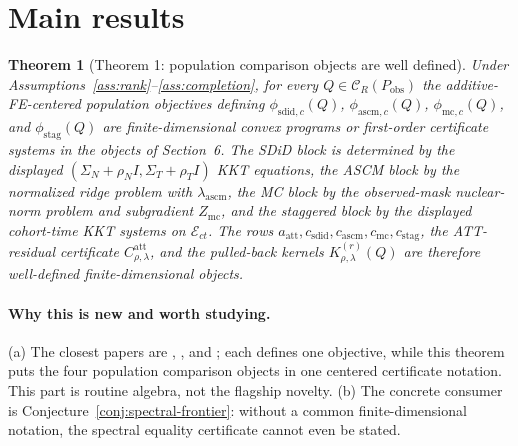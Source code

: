 \documentclass[11pt]{article}
\theoremstyle{definition}
\theoremstyle{plain}
\newtheorem{theorem}{Theorem}
\theoremstyle{remark}
\begin{document}
\section{Main results}
\begin{theorem}[Theorem 1: population comparison objects are well defined]\label{thm:functionals}
Under Assumptions~\ref{ass:rank}--\ref{ass:completion}, for every \(Q\in\mathcal C_R(P_{\mathrm{obs}})\) the additive-FE-centered population objectives defining \(\phi_{\mathrm{sdid},c}(Q)\), \(\phi_{\mathrm{ascm},c}(Q)\), \(\phi_{\mathrm{mc},c}(Q)\), and \(\phi_{\mathrm{stag}}(Q)\) are finite-dimensional convex programs or first-order certificate systems in the objects of Section~6.  The SDiD block is determined by the displayed \((\Sigma_N+\rho_N I,\Sigma_T+\rho_T I)\) KKT equations, the ASCM block by the normalized ridge problem with \(\lambda_{\mathrm{ascm}}\), the MC block by the observed-mask nuclear-norm problem and subgradient \(Z_{\mathrm{mc}}\), and the staggered block by the displayed cohort-time KKT systems on \(\mathcal E_{ct}\).  The rows \(a_{\mathrm{att}},c_{\mathrm{sdid}},c_{\mathrm{ascm}},c_{\mathrm{mc}},c_{\mathrm{stag}}\), the ATT-residual certificate \(C^{\mathrm{att}}_{\rho,\lambda}\), and the pulled-back kernels \(K^{(r)}_{\rho,\lambda}(Q)\) are therefore well-defined finite-dimensional objects.
\end{theorem}
\paragraph{Why this is new and worth studying.}
(a) The closest papers are \citet{ArkhangelskyAtheyHirshbergImbensWager2021}, \citet{BenMichaelFellerRothstein2021}, and \citet{AtheyBayatiDoudchenkoImbensKhosravi2021}; each defines one objective, while this theorem puts the four population comparison objects in one centered certificate notation.  This part is routine algebra, not the flagship novelty.  (b) The concrete consumer is Conjecture~\ref{conj:spectral-frontier}: without a common finite-dimensional notation, the spectral equality certificate cannot even be stated.
\end{document}
